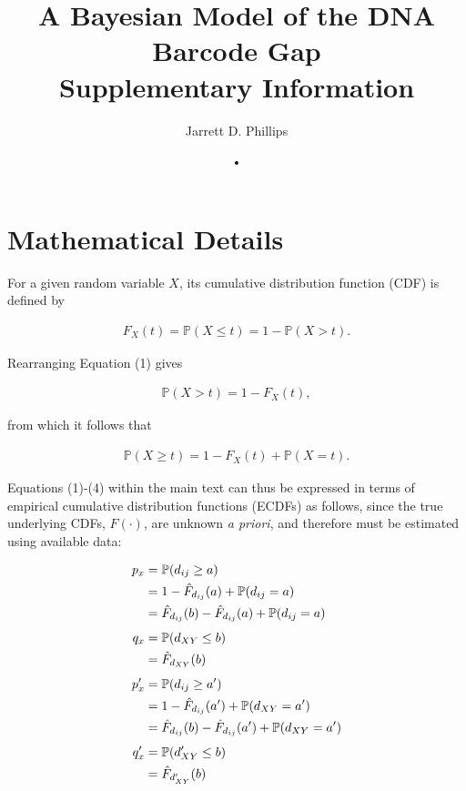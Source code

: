\documentclass[12pt]{article}
\begin{document}
\title{A Bayesian Model of the DNA Barcode Gap \\ \vspace{5mm} Supplementary Information}

\author{Jarrett D. Phillips}

\date{•}

\maketitle

\section{Mathematical Details}

For a given random variable $X$, its cumulative distribution function (CDF) is defined by

\begin{align}
F_X(t) = \mathbb{P}(X \leq t) = 1 - \mathbb{P}(X > t). 
\end{align}

\noindent Rearranging Equation (1) gives

\begin{align}
\mathbb{P}(X > t) = 1 - F_X(t),
\end{align}

\noindent from which it follows that

\begin{align}
\mathbb{P}(X \geq t) = 1 - F_X(t) + \mathbb{P}(X = t).
\end{align}

Equations (1)-(4) within the main text can thus be expressed in terms of empirical cumulative distribution functions (ECDFs) as follows, since the true underlying CDFs, $F(\cdot)$, are unknown \textit{a priori}, and therefore must be estimated using available data:

\begin{align}
p_x  &= \mathbb{P}(d_{ij} \geq a) \notag \\
     &= 1 - \hat{F}_{d_{ij}}(a) + \mathbb{P}(d_{ij} = a) \notag \\
     &= \hat{F}_{d_{ij}}(b) - \hat{F}_{d_{ij}}(a) +  \mathbb{P}(d_{ij} = a) \\[1ex]
q_x  &=  \mathbb{P}(d_{XY} \leq b) \notag \\
     &= \hat{F}_{d_{XY}}(b) \\[1ex]
p'_x &=  \mathbb{P}(d_{ij} \geq a') \notag \\
     &= 1 - \hat{F}_{d_{ij}}(a') +  \mathbb{P}(d_{XY} = a') \notag \\
     &= \hat{F}_{d_{ij}}(b) - \hat{F}_{d_{ij}}(a') +  \mathbb{P}(d_{XY} = a')  \\[1ex]
q'_x &=  \mathbb{P}(d'_{XY} \leq b) \notag \\
     &= \hat{F}_{d'_{XY}}(b)
\end{align}
\end{document}
